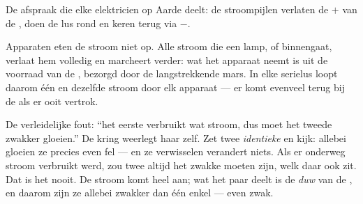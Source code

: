 \begin{omfigure}

{\small De afspraak die elke elektricien op Aarde deelt: de
stroompijlen verlaten de $+$ van de , doen de lus rond en
keren terug via $-$.}
\end{omfigure}

\begin{proposition}\label{prop:g7:circuits-series-parallel:notconsumed}
Apparaten eten de stroom niet op. Alle stroom die een lamp,
 of  binnengaat, verlaat hem volledig en marcheert
verder: wat het apparaat neemt is \emph{} uit de voorraad van
de , bezorgd door de langstrekkende mars. In elke serielus
loopt daarom één en dezelfde stroom door elk apparaat --- er komt
evenveel terug bij de  als er ooit vertrok.
\end{proposition}

\begin{example}\label{ex:g7:circuits-series-parallel:trial}
De verleidelijke fout: ``het eerste  verbruikt wat stroom, dus
moet het tweede zwakker gloeien.'' De kring weerlegt haar zelf. Zet
twee \emph{identieke}   en kijk: allebei gloeien ze
precies even fel --- en ze verwisselen verandert niets. Als er onderweg
stroom verbruikt werd, zou  twee altijd het zwakke moeten zijn,
welk  daar ook zit. Dat is het nooit. De stroom komt heel aan;
wat het paar deelt is de \emph{duw} van de , en daarom zijn ze
allebei zwakker dan één enkel  --- even zwak.
\end{example}


